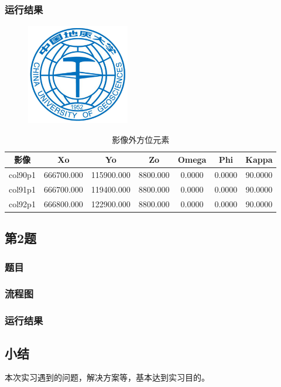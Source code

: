     \subsubsection{运行结果}
        \begin{figure}[H]
            \centering
            \includegraphics[width=0.4\textwidth]{cuglogo.png}
        \end{figure}

    \begin{table}[H]
        \centering
        \begin{tabular}{ccccccc}
            \toprule
            影像    & Xo         & Yo         & Zo       & Omega  & Phi    & Kappa   \\
            \midrule
            col90p1 & 666700.000 & 115900.000 & 8800.000 & 0.0000 & 0.0000 & 90.0000 \\
            col91p1 & 666700.000 & 119400.000 & 8800.000 & 0.0000 & 0.0000 & 90.0000 \\
            col92p1 & 666800.000 & 122900.000 & 8800.000 & 0.0000 & 0.0000 & 90.0000 \\
            \bottomrule
        \end{tabular}
        \caption{影像外方位元素}
        \label{lps_expos}
    \end{table}

\subsection{第2题}
    \subsubsection{题目}
    \subsubsection{流程图}
    \subsubsection{运行结果}

\subsection{小结}
本次实习遇到的问题，解决方案等，基本达到实习目的。
